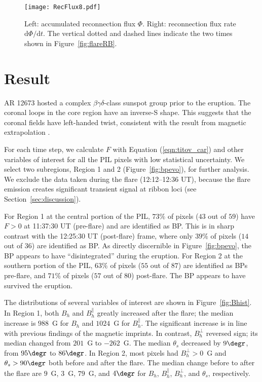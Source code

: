 \documentclass[times,twocolumn]{aastex631}
\begin{document}
\begin{CJK*}{UTF8}{gbsn}

\begin{figure*}[t!]
\centering
\texttt{[image: RecFlux8.pdf]}
\caption{Left: accumulated reconnection flux $\Phi$. Right: reconnection flux rate $\mathrm{d}\Phi/\mathrm{d}t$. The vertical dotted and dashed lines indicate the two times shown in Figure~\ref{fig:flareRB}.}
\label{fig:recflux}
\end{figure*}


\section{Result}
\label{sec:result}

AR 12673 hosted a complex $\beta\gamma\delta$-class sunspot group prior to the eruption. The coronal loops in the core region have an inverse-S shape. This suggests that the coronal fields have left-handed twist, consistent with the result from magnetic extrapolation \citep[e.g.,][]{wangr2018}.

For each time step, we calculate $F$ with Equation (\ref{eqn:titov_car}) and other variables of interest for all the PIL pixels with low statistical uncertainty. We select two subregions, Region 1 and 2  (Figure~\ref{fig:bpevo}), for further analysis. We exclude the data taken during the flare (12:12--12:36 UT), because the flare emission creates significant transient signal at ribbon loci (see Section~\ref{sec:discussion}).

For Region 1 at the central portion of the PIL, $73\%$ of pixels ($43$ out of $59$) have $F>0$ at 11:37:30 UT (pre-flare) and are identified as BP. This is in sharp contrast with the 12:25:30 UT (post-flare) frame, where only $39\%$ of pixels ($14$ out of $36$) are identified as BP. As directly discernible in Figure~\ref{fig:bpevo}, the BP appears to have ``disintegrated'' during the eruption. For Region 2 at the southern portion of the PIL, $63\%$ of pixels ($55$ out of $87$) are identified as BPs pre-flare, and $71\%$ of pixels ($57$ out of $80$) post-flare. The BP appears to have survived the eruption.

The distributions of several variables of interest are shown in Figure~\ref{fig:Bhist}. In Region 1, both $B_{h}$ and $B_{h}^{\parallel}$ greatly increased after the flare; the median increase is $988$~G for $B_{h}$ and $1024$~G for $B_{h}^{\parallel}$. The significant increase is in line with previous findings of the magnetic imprints. In contrast, $B_{h}^{\perp}$ reversed sign; its median changed from $201$~G to $-262$~G. The median $\theta_s$ decreased by $9\degr$, from $95\degr$ to $86\degr$. In Region 2, most pixels had $B_{h}^{\perp}>0$~G and $\theta_s>90\degr$ both before and after the flare. The median change before to after the flare are $9$~G, $3$~G, $79$~G, and $4\degr$ for $B_h$, $B_h^\parallel$, $B_h^\perp$, and $\theta_s$, respectively.


\end{CJK*}
\end{document}

